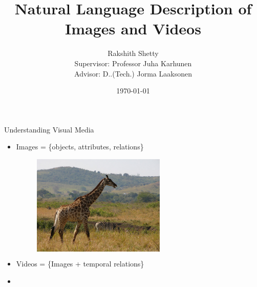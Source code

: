 \documentclass{beamer}
\begin{document}

\title{Natural Language Description of \\Images and Videos}
\author[Rakshith Shetty]{Rakshith Shetty\\[4mm] {\small Supervisor: Professor Juha Karhunen\\ Advisor: D.\@Sc.\@ (Tech.\@) Jorma Laaksonen}}
\date{\today}

\frame{\titlepage} 



\begin{frame}{Understanding Visual Media}
  \begin{itemize}
  \item<1-> Images = \{objects, attributes, relations\}\\
  \begin{figure}[h]
    \begin{columns}
    \hfill\includegraphics[width=0.6\textwidth]{images/COCO_train2014_000000544856.jpg}
    \hspace{-5mm}
    \centering
    \caption{}
    \end{columns}
  \end{figure}
  \item<2->Videos = \{Images + temporal relations\}\\[4mm]
  \item<3->
  \end{itemize}
\end{frame}
\end{document}

